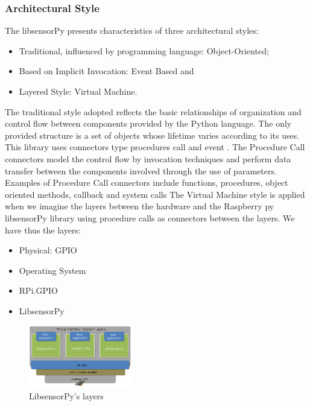 \documentclass{acm_proc_article-sp}
\begin{document}
\subsubsection{Architectural Style}
The libsensorPy presents characteristics of three architectural styles: 
\begin{itemize}
\item Traditional, influenced by programming language: Object-Oriented;
\item Based on Implicit Invocation: Event Based and 
\item Layered Style: Virtual Machine.
\end{itemize}

The traditional style adopted reflects the basic relationships of organization and control flow between components provided by the Python language. The only provided structure is a set of objects whose lifetime varies according to its uses. This library uses connectors type procedures call and event . The Procedure Call connectors model the control flow by invocation techniques and perform data transfer between the components involved through the use of parameters. Examples of Procedure Call connectors include functions, procedures,  object oriented methods, callback and system calls
\newline
\newline
The Virtual Machine style is applied when we imagine the layers between the hardware and the Raspberry py libsensorPy library using procedure calls as connectors between the layers. We have thus the layers:
\begin{itemize}
\item Physical: GPIO
\item Operating System
\item RPi.GPIO
\item LibsensorPy
\end{itemize}

\begin{figure}[h]
    \includegraphics[width=0.4\textwidth,natwidth=610,natheight=642]{pictures/machinelayers.png}
    \caption{LibsensorPy's layers}
    \label{fig:layers}
\end{figure}
\end{document}
